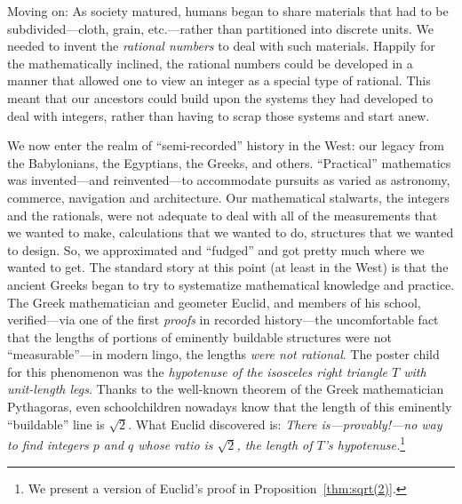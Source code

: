 
Moving on: As society matured, humans began to share materials that had to be subdivided---cloth, grain, etc.---rather than partitioned into discrete units.  We needed to invent the {\it rational numbers} to deal with such materials.  Happily for the mathematically inclined, the rational numbers could be developed in a manner that allowed one to view an integer as a special type of rational.  This meant that our ancestors could build upon the systems they had developed to deal with integers, rather than having to scrap those systems and start anew.

\bigskip

\noindent {}

\bigskip

 

\noindent
We now enter the realm of ``semi-recorded'' history in the West: our legacy from the Babylonians, the Egyptians, the Greeks, and others.  ``Practical'' mathematics was invented---and reinvented---to accommodate pursuits as varied as astronomy, commerce, navigation and architecture.  Our mathematical stalwarts, the integers and the rationals, were not adequate to deal with all of the measurements that we wanted to make, calculations that we wanted to do, structures that we wanted to design.  So, we approximated and ``fudged'' and got pretty much where we wanted to get.  The standard story at this point (at least in the West) is that the ancient Greeks began to try to systematize mathematical knowledge and practice.  The Greek mathematician and geometer Euclid,  and members of his school, verified---via one of the first {\em proofs} in recorded history---the uncomfortable fact that the lengths of portions of eminently buildable structures were not ``measurable''---in modern lingo, the lengths {\em were not rational}.  The poster child for this phenomenon was the {\em hypotenuse of the isosceles right triangle $T$ with unit-length legs}.  Thanks to the well-known theorem of the Greek mathematician Pythagoras, even schoolchildren nowadays know that the length of this eminently ``buildable'' line is $\sqrt{2}$.  What Euclid discovered is: {\em There is---provably!---no way to find integers $p$ and $q$ whose ratio is $\sqrt{2}$, the length of $T$'s hypotenuse.}\footnote{We present a version of Euclid's proof in Proposition~\ref{thm:sqrt(2)}.}

